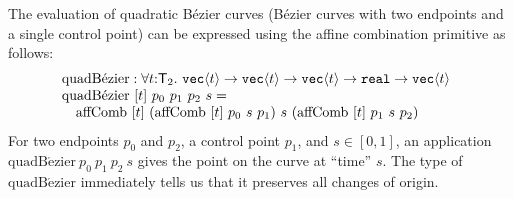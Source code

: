 \begin{example}
  The evaluation of quadratic B\'{e}zier curves (B\'{e}zier curves
  with two endpoints and a single control point) can be expressed
  using the affine combination primitive as follows: %
  \begin{displaymath}
    \begin{array}{@{}l}
      \mathrm{quadB\acute{e}zier} : \forall t
      \mathord:\SynTransl{2}.\ \tyPrim{vec}{t} \to \tyPrim{vec}{t} \to
      \tyPrim{vec}{t} \to \tyPrimNm{real} \to \tyPrim{vec}{t}
      \\ \mathrm{quadB\acute{e}zier}\ [t]\ p_0\ p_1\ p_2\ s = \\ \quad
      \mathrm{affComb}\ [t]\ (\mathrm{affComb}\ [t]\ p_0\ s\ p_1)\ s\ (\mathrm{affComb}\ [t]\ p_1\ s\ p_2)
      \\
    \end{array}
  \end{displaymath}
  For two endpoints $p_0$ and $p_2$, a control point $p_1$, and $s \in
  [0,1]$, an application
  $\mathrm{quadB\acute{e}zier}\ p_0\ p_1\ p_2\ s$ gives the point on
  the curve at ``time'' $s$.  The type of
  $\mathrm{quadB\acute{e}zier}$ immediately tells us that it preserves
  all changes of origin.
\end{example}

